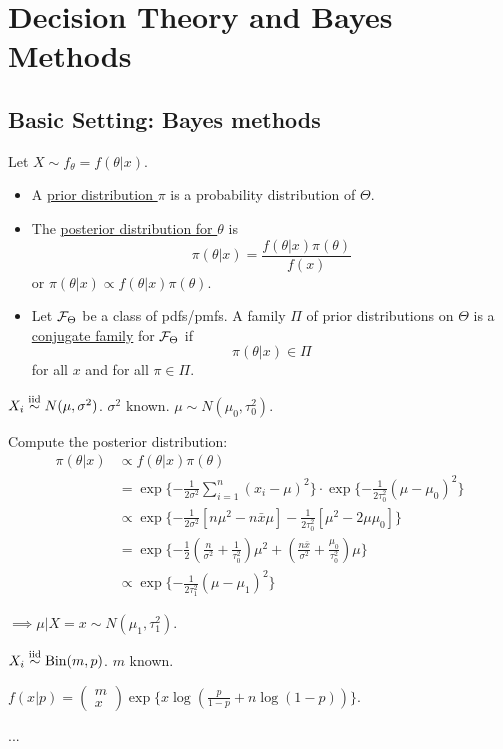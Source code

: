\section{Decision Theory and Bayes Methods}

\subsection{Basic Setting: Bayes methods}
\begin{mydef} Let $X \sim f_\theta = f(\theta| x)$.
	\begin{itemize}
		\item 
		A \uline{prior distribution $\pi$} is a probability distribution of $\Theta$.
		
		\item 
		The \uline{posterior distribution for $\theta$} is 
		$$\pi(\theta |x) = \frac{ f(\theta | x) \pi(\theta) }{ f(x) }$$
		or $\pi(\theta | x) \propto f(\theta| x) \pi(\theta)$.
		
		\item 
		Let $\mathcal{F}_\Theta$ be a class of pdfs/pmfs. A family $\Pi$ of prior distributions on $\Theta$ is a \uline{conjugate family} for $\mathcal{F}_\Theta$ if $$\pi(\theta|x) \in \Pi$$ for all $x$ and for all $\pi \in \Pi$.
	\end{itemize}
\end{mydef}

\begin{exap}
	$X_i \stackrel{\text{iid}}{\sim} N(\mu,\sigma^2)$. $\sigma^2$ known. $\mu \sim N(\mu_0, \tau^2_0)$.
	
	Compute the posterior distribution:
	\begin{align*}
		\pi(\theta | x) &\propto f(\theta| x) \pi(\theta) \\
		&= \exp\{ -\frac{1}{2\sigma^2} \sum^n_{i=1}(x_i -\mu)^2  \} \cdot \exp\{ -\frac{1}{2\tau_0^2} (\mu - \mu_0)^2 \}\\
		&\propto \exp\{ -\frac{1}{2\sigma^2} [ n \mu^2 - n\bar{x}\mu ]  -\frac{1}{2\tau_0^2} [\mu^2 - 2\mu \mu_0] \} \\
		&= \exp\{ -\frac{1}{2}( \frac{n}{\sigma^2}+ \frac{1}{\tau_0^2} ) \mu^2 + ( \frac{n\bar{x}}{\sigma^2} + \frac{\mu_0}{\tau^2_0} )\mu \} \\
		&\propto \exp\{ -\frac{1}{2\tau^2_1} (\mu - \mu_1)^2 \}
	\end{align*}
	
	$\implies \mu|X=x \sim N(\mu_1, \tau_1^2)$.
\end{exap} 

\begin{exap}
	$X_i \stackrel{\text{iid}}{\sim} \mathrm{Bin}(m,p)$. $m$ known. 
	
	$f(x|p) = \begin{pmatrix}
	m \\
	x
	\end{pmatrix} \exp\{ x\log( \frac{p}{1-p} +n\log(1-p)) \}$.

	...
\end{exap}

